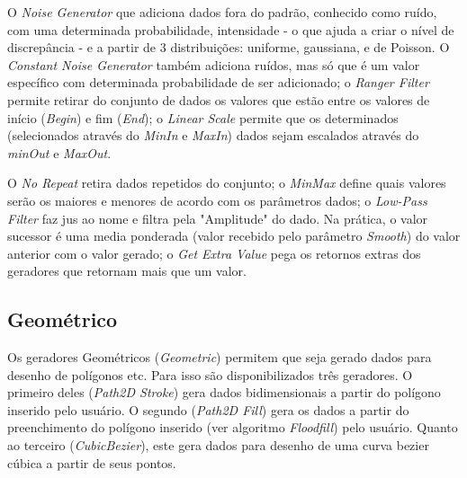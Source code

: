 \documentclass[
	12pt,				%
	openright,			%
	twoside,			%
	a4paper,			%
	english,			%
	brazil				%
	]{abntex2}
\begin{document}
			\par
				O \emph{Noise Generator} que adiciona dados fora do padrão, conhecido como ruído, com uma determinada probabilidade, intensidade - o que ajuda a criar o nível de discrepância - e a partir de 3 distribuições: uniforme, gaussiana, e de Poisson.
				O \emph{Constant Noise Generator} também adiciona ruídos, mas só que é um valor específico com determinada probabilidade de ser adicionado;
				o \emph{Ranger Filter} permite retirar do conjunto de dados os valores que estão entre os valores de início (\emph{Begin}) e fim (\emph{End});
				o \emph{Linear Scale} permite que os determinados (selecionados através do \emph{MinIn} e \emph{MaxIn}) dados sejam escalados através do \emph{minOut} e \emph{MaxOut}.
			\par
			O \emph{No Repeat} retira dados repetidos do conjunto;
				o \emph{MinMax} define quais valores serão os maiores e menores de acordo com os parâmetros dados;
				o \emph{Low-Pass Filter} faz jus ao nome e filtra pela "Amplitude" do dado. Na prática, o valor sucessor é uma media ponderada (valor recebido pelo parâmetro \emph{Smooth}) do valor anterior com o valor gerado;
				o \emph{Get Extra Value} pega os retornos extras dos geradores que retornam mais que um valor.
		\subsection{Geométrico}
			Os geradores Geométricos (\emph{Geometric}) permitem que seja gerado dados para desenho de polígonos etc.
			Para isso são disponibilizados três geradores.
			O primeiro deles (\emph{Path2D Stroke}) gera dados bidimensionais a partir do polígono inserido pelo usuário.
			O segundo (\emph{Path2D Fill}) gera os dados a partir do preenchimento do polígono inserido  (ver algoritmo \emph{Floodfill}) pelo usuário.
			Quanto ao terceiro (\emph{CubicBezier}), este gera dados para desenho de uma curva bezier cúbica a partir de seus pontos.
\end{document}
